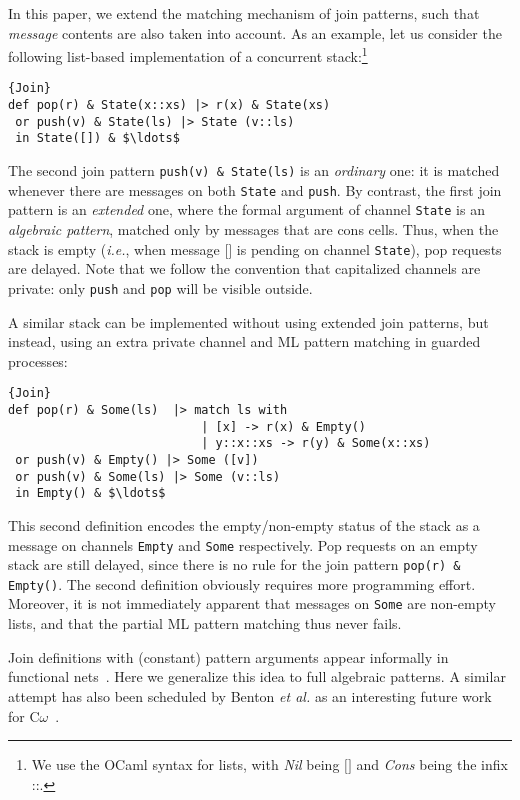 \documentclass{LMCS}
\makeatletter
\let \lst \lstinline
\newcommand{\etal}{\emph{et al.}\@\xspace}
\newcommand{\ie}{\emph{i.e.}\@\xspace}
\newcommand{\ocaml}{\textrm{OCaml}\xspace}
\newcommand{\comega}{C$\omega$\xspace}
\newcommand{\cons}[2]{#1\mathord{\texttt{::}}#2}
\newcommand{\nil}{\texttt{[]}}
\renewcommand{\_}{\mathord{\rule[-.25ex]{1ex}{.15ex}}}
\makeatother
\begin{document}
In this paper, we extend the matching mechanism of join patterns, such
that \emph{message} contents are also taken into account. As an
example, let us consider the following list-based implementation of a
concurrent stack:\footnote{We use the \ocaml syntax for lists,
  with \emph{Nil} being $\nil$ and \emph{Cons} being the infix
  $\cons{}{}$.}
\begin{lstlisting}{Join}
def pop(r) & State(x::xs) |> r(x) & State(xs)
 or push(v) & State(ls) |> State (v::ls) 
 in State([]) & $\ldots$
\end{lstlisting}
The second join pattern \lst"push(v) & State(ls)" is an
\emph{ordinary} one: it is matched whenever there are messages on both
\lst"State" and \lst"push". By contrast, the first join pattern is an
\emph{extended} one, where the formal argument of channel \lst"State"
is an \emph{algebraic pattern}, matched only by messages that are
cons cells.  Thus, when the stack is empty (\ie, when message
$\nil$ is pending on channel \lst"State"), pop requests are delayed.
Note that we follow the convention that capitalized channels are
private: only \lst"push" and \lst"pop" will be visible outside.

A similar stack can be implemented without using extended join
patterns, but instead, using an extra private channel and ML pattern
matching in guarded processes:
\begin{lstlisting}{Join}
def pop(r) & Some(ls)  |> match ls with 
                           | [x] -> r(x) & Empty() 
                           | y::x::xs -> r(y) & Some(x::xs)
 or push(v) & Empty() |> Some ([v])
 or push(v) & Some(ls) |> Some (v::ls)
 in Empty() & $\ldots$
\end{lstlisting}
This second definition encodes the empty/non-empty status of
the stack as a message on channels \lst|Empty| and \lst|Some| respectively.
Pop requests on an empty stack are still delayed, since there is
no rule for the join pattern \lst|pop(r) & Empty()|.
The second definition obviously requires more programming
effort. Moreover, it is not immediately apparent that messages on
\lst"Some" are non-empty lists, and that the partial ML pattern
matching thus never fails.

Join definitions with (constant) pattern arguments appear informally
in functional nets~\cite{odersky:esop2000}. Here we generalize this
idea to full algebraic patterns. A similar attempt has also been
scheduled by Benton \etal as an interesting future work for
\comega~\cite{Cw}.
\end{document}
